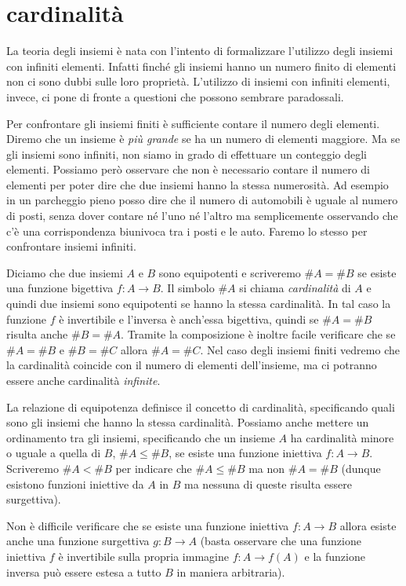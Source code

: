 \documentclass[italian,a4paper,hidelinks]{scrartcl}
\newcommand{\myemph}[1]{\emph{#1}\marginpar{#1}}
\begin{document}
\section{cardinalità}

La teoria degli insiemi è nata con l'intento di formalizzare l'utilizzo degli
insiemi con infiniti elementi. Infatti finché gli insiemi hanno un numero finito
di elementi non ci sono dubbi sulle loro proprietà. L'utilizzo di insiemi con
infiniti elementi, invece, ci pone di fronte a questioni che possono sembrare
paradossali.

Per confrontare gli insiemi finiti è sufficiente contare il numero degli elementi.
Diremo che un insieme è \emph{più grande} se ha un numero di elementi maggiore.
Ma se gli insiemi sono infiniti, non siamo in grado di effettuare un conteggio
degli elementi. Possiamo però osservare che non è necessario contare il numero
di elementi per poter dire che due insiemi hanno la stessa numerosità.
Ad esempio in un parcheggio pieno posso dire che il numero di automobili
è uguale al numero di posti, senza dover contare né l'uno né l'altro ma semplicemente
osservando che c'è una corrispondenza biunivoca tra i posti e le auto. Faremo
lo stesso per confrontare insiemi infiniti.

Diciamo che due insiemi $A$ e $B$ sono equipotenti e scriveremo $\#A = \#B$
se esiste una funzione bigettiva $f\colon A \to B$.
Il simbolo $\#A$ si chiama \myemph{cardinalità} di $A$ e quindi due insiemi
sono equipotenti se hanno la stessa cardinalità.
In tal caso la funzione
$f$ è invertibile e l'inversa è anch'essa bigettiva,
quindi se $\#A = \#B$ risulta anche $\#B = \#A$.
Tramite la composizione è inoltre facile verificare che se $\#A = \#B$ e $\#B = \#C$
allora $\#A = \#C$.
Nel caso degli insiemi finiti vedremo che la cardinalità coincide con il
numero di elementi dell'insieme, ma ci potranno essere anche cardinalità
\emph{infinite}.

La relazione di equipotenza definisce il concetto di cardinalità, specificando
quali sono gli insiemi che hanno la stessa cardinalità. Possiamo anche mettere
un ordinamento tra gli insiemi, specificando che un insieme $A$ ha cardinalità
minore o uguale a quella di $B$, $\#A\le \#B$, se esiste una funzione
iniettiva $f\colon A \to B$. Scriveremo $\#A < \#B$ per indicare che
$\#A \le \#B$ ma non $\#A = \#B$ (dunque esistono funzioni iniettive da $A$ in $B$
ma nessuna di queste risulta essere surgettiva).

Non è difficile verificare che se esiste una funzione iniettiva $f\colon A\to B$
allora esiste anche una funzione surgettiva $g\colon B\to A$
(basta osservare che una funzione iniettiva $f$ è invertibile sulla propria
immagine $f\colon A \to f(A)$ e la funzione inversa può essere estesa a
tutto $B$ in maniera arbitraria).
\end{document}
